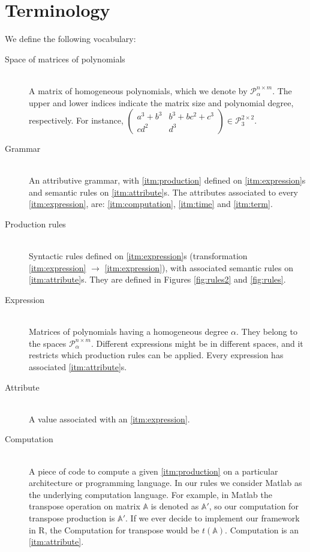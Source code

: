 \section{Terminology}
We define the following vocabulary: 
\vspace{-2mm}
\begin{description}
  \item[Space of matrices of polynomials\label{itm:spacematrices}] \hfill \\ A matrix of homogeneous polynomials, which we denote by $\mathcal{P}^{n \times m}_{\alpha}$. The upper and lower indices indicate the matrix size and polynomial degree, respectively. For instance, $\begin{pmatrix} a^3 + b^3 & b^3 + bc^2 + c^3\\ cd^2 & d^3 \end{pmatrix} \in \mathcal{P}^{2 \times 2}_3$. 

\item[Grammar\label{itm:grammar}] \hfill \\ An attributive grammar, with \ref{itm:production} defined on \ref{itm:expression}s and semantic rules on \ref{itm:attribute}s. The attributes associated to every \ref{itm:expression}, are: \ref{itm:computation}, \ref{itm:time} and \ref{itm:term}.

\item[Production rules\label{itm:production}] \hfill \\ Syntactic rules defined on \ref{itm:expression}s (transformation \ref{itm:expression} $\rightarrow$ \ref{itm:expression}), with associated semantic rules on \ref{itm:attribute}s. They are defined in Figures \ref{fig:rules2} and \ref{fig:rules}.

\item[Expression\label{itm:expression}] \hfill \\ Matrices of polynomials having a homogeneous degree $\alpha$. They belong to the spaces $\mathcal{P}^{n \times m}_\alpha$. Different expressions might be in different spaces, and it restricts which production rules can be applied. Every expression has associated \ref{itm:attribute}s.

\item[Attribute\label{itm:attribute}] \hfill \\
  A value associated with an \ref{itm:expression}. 

\item[Computation\label{itm:computation}] \hfill \\ A piece of code to compute a given \ref{itm:production} on a particular architecture or programming language. In our rules we consider Matlab as
the underlying computation language. For example, in Matlab the transpose
  operation on matrix $\mathbb{A}$ is denoted as $\mathbb{A}'$, so our computation
  for transpose production is $\mathbb{A}'$. If we ever decide to implement our framework in R,
  the Computation for transpose would be $t(\mathbb{A})$. Computation is an \ref{itm:attribute}.


\end{description}
